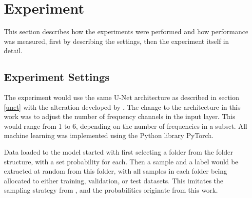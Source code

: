 \section{Experiment} \label{Experiment}
    This section describes how the experiments were performed and how performance was measured, first by describing the settings, then the experiment itself in detail.
    
    \subsection{Experiment Settings} \label{Experiment settings}
        The experiment would use the same U-Net architecture as described in section \ref{unet} with the alteration developed by \citeauthor{brautaset2020acoustic}\cite{brautaset2020acoustic}. The change to the architecture in this work was to adjust the number of frequency channels in the input layer. This would range from 1 to 6, depending on the number of frequencies in a subset. All machine learning was implemented using the Python library PyTorch\cite{NEURIPS2019_9015}. %
        
        Data loaded to the model started with first selecting a folder from the folder structure, with a set probability for each. Then a sample and a label would be extracted at random from this folder, with all samples in each folder being allocated to either training, validation, or test datasets. This imitates the sampling strategy from \citeauthor{brautaset2020acoustic}\cite{brautaset2020acoustic}, and the probabilities originate from this work.
        
